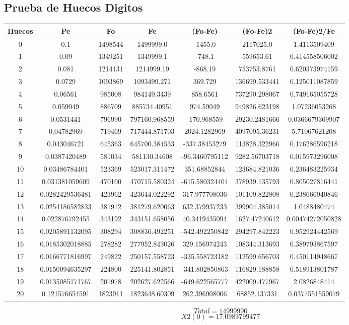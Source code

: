 \documentclass{article}
\begin{document}
\subsection{Prueba de Huecos Digitos}
\begin{tabular}{|c|c|c|c|c|c|c|}
Huecos&Pe&Fo&Fe&(Fo{-}Fe)&(Fo{-}Fe)2&(Fo{-}Fe)2/Fe\\
\hline
0&0.1&1498544&1499999.0&{-}1455.0&2117025.0&1.4113509409\\
\hline
1&0.09&1349251&1349999.1&{-}748.1&559653.61&0.414558506002\\
\hline
2&0.081&1214131&1214999.19&{-}868.19&753753.8761&0.620373974159\\
\hline
3&0.0729&1093869&1093499.271&369.729&136699.533441&0.125011087859\\
\hline
4&0.06561&985008&984149.3439&858.6561&737290.298067&0.749165055728\\
\hline
5&0.059049&886709&885734.40951&974.59049&949826.623198&1.07236053268\\
\hline
6&0.0531441&796990&797160.968559&{-}170.968559&29230.2481666&0.0366679369907\\
\hline
7&0.04782969&719469&717444.871703&2024.1282969&4097095.36231&5.71067621208\\
\hline
8&0.043046721&645363&645700.384533&{-}337.38453279&113828.322966&0.176286596218\\
\hline
9&0.0387420489&581034&581130.34608&{-}96.3460795112&9282.56703718&0.015973296008\\
\hline
10&0.03486784401&523369&523017.311472&351.68852844&123684.821036&0.236483225934\\
\hline
11&0.031381059609&470100&470715.580324&{-}615.580324404&378939.135793&0.805027816441\\
\hline
12&0.0282429536481&423962&423644.022292&317.977708036&101109.822808&0.238666940846\\
\hline
13&0.0254186582833&381912&381279.620063&632.379937233&399904.385014&1.0488480474\\
\hline
14&0.022876792455&343192&343151.658056&40.3419435094&1627.47240612&0.00474272050828\\
\hline
15&0.0205891132095&308294&308836.492251&{-}542.492250842&294297.842223&0.952924442569\\
\hline
16&0.0185302018885&278282&277952.843026&329.156974243&108344.313693&0.389793867597\\
\hline
17&0.0166771816997&249822&250157.558723&{-}335.558723182&112599.656703&0.450114948667\\
\hline
18&0.0150094635297&224800&225141.802851&{-}341.802850863&116829.188858&0.518913801787\\
\hline
19&0.0135085171767&201978&202627.622566&{-}649.622565777&422009.477967&2.0826848414\\
\hline
20&0.121576654591&1823911&1823648.60309&262.396908006&68852.137331&0.0377551559079\\
\end{tabular}
$$
Total = 14999990
$$
$$
X2(0) = 17.0983799477
$$
\end{document}
